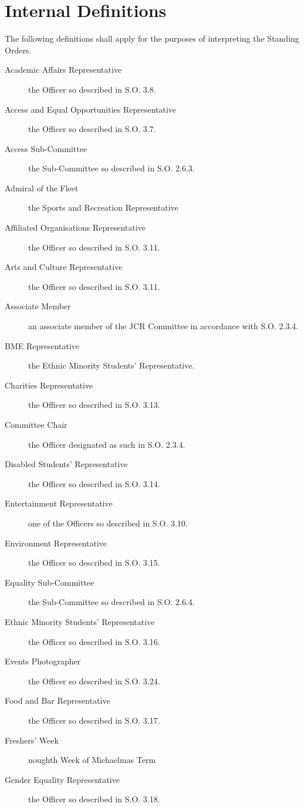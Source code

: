 \chapter{Internal Definitions}

\appnpara The following definitions shall apply for the purposes of interpreting the Standing Orders.
\begin{description}
\item[Academic Affairs Representative] the Officer so described in S.O. 3.8.
\item[Access and Equal Opportunities Representative] the Officer so described in S.O. 3.7.
\item[Access Sub-Committee] the Sub-Committee so described in S.O. 2.6.3.
\item[Admiral of the Fleet] the Sports and Recreation Representative
\item[Affiliated Organisations Representative] the Officer so described in S.O. 3.11.
\item[Arts and Culture Representative] the Officer so described in S.O. 3.11.
\item[Associate Member] an associate member of the JCR Committee in accordance with S.O. 2.3.4.
\item[BME Representative] the Ethnic Minority Students’ Representative.
\item[Charities Representative] the Officer so described in S.O. 3.13.
\item[Committee Chair] the Officer designated as such in S.O. 2.3.4.
\item[Disabled Students’ Representative] the Officer so described in S.O. 3.14.
\item[Entertainment Representative] one of the Officers so described in S.O. 3.10.
\item[Environment Representative] the Officer so described in S.O. 3.15.
\item[Equality Sub-Committee] the Sub-Committee so described in S.O. 2.6.4.
\item[Ethnic Minority Students' Representative] the Officer so described in S.O. 3.16.
\item[Events Photographer] the Officer so described in S.O. 3.24.
\item[Food and Bar Representative] the Officer so described in S.O. 3.17.
\item[Freshers' Week] noughth Week of Michaelmas Term
\item[Gender Equality Representative] the Officer so described in S.O. 3.18.

\end{description}
